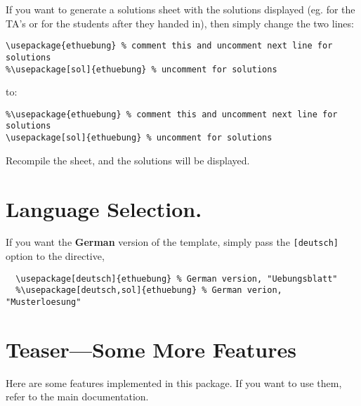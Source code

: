 \documentclass[11pt,a4paper]{article}
\begin{document}
If you want to generate a solutions sheet with the solutions displayed (eg. for the TA's
or for the students after they handed in), then simply change the two lines:
\begin{pkgverbatim}
\begin{verbatim}
\usepackage{ethuebung} % comment this and uncomment next line for solutions
%\usepackage[sol]{ethuebung} % uncomment for solutions
\end{verbatim}
\end{pkgverbatim}
to:
\begin{pkgverbatim}
\begin{verbatim}
%\usepackage{ethuebung} % comment this and uncomment next line for solutions
\usepackage[sol]{ethuebung} % uncomment for solutions
\end{verbatim}
\end{pkgverbatim}

Recompile the sheet, and the solutions will be displayed.


\section*{Language Selection.}

If you want the {\bfseries German} version of the template, simply pass the
\texttt{[deutsch]} option to the  directive,
\begin{pkgverbatim}
\begin{verbatim}
  \usepackage[deutsch]{ethuebung} % German version, "Uebungsblatt"
  %\usepackage[deutsch,sol]{ethuebung} % German verion, "Musterloesung"
\end{verbatim}
\end{pkgverbatim}


\section*{Teaser---Some More Features}

Here are some features implemented in this package. If you want to use them, refer to the
main documentation.
\end{document}

